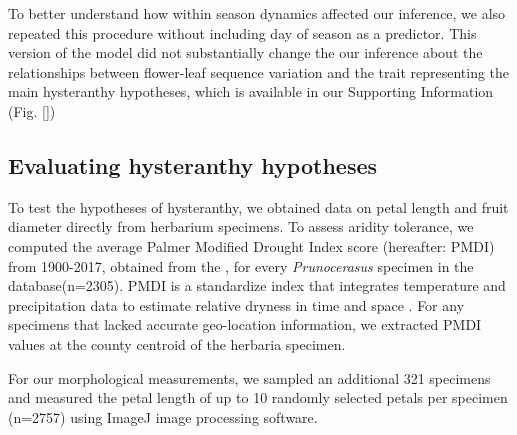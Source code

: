 \documentclass{article}[12pt]
\begin{document}
To better understand how within season dynamics affected our inference, we also repeated this procedure without including day of season as a predictor. This version of the model did not substantially change the our inference about the relationships between flower-leaf sequence variation and the trait representing the main hysteranthy hypotheses, which is available in our Supporting Information (Fig. \ref{})

\subsection*{Evaluating hysteranthy hypotheses}

To test the hypotheses of hysteranthy, we obtained data on petal length and fruit diameter directly from herbarium specimens. To assess aridity tolerance, we computed the average Palmer Modified Drought Index score (hereafter: PMDI) from 1900-2017, obtained from the \citet{NOAA}, for every \textit{Prunocerasus} specimen in the database(n=2305). PMDI is a standardize index that integrates temperature and precipitation data to estimate relative dryness in time and space \citep{Heim:2002uw}. For any specimens that lacked accurate geo-location information, we extracted PMDI values at the county centroid of the herbaria specimen. 

\noindent For our morphological measurements, we sampled an additional 321 specimens and measured the petal length of up to 10 randomly selected petals per specimen (n=2757) using ImageJ image processing software.%
\end{document}
